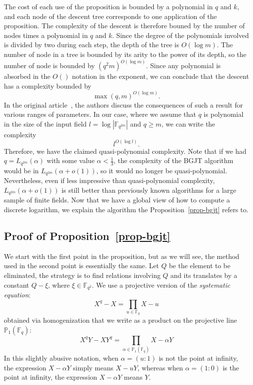 \documentclass[a4paper,11pt]{article}
\theoremstyle{break}
\theoremstyle{sc}
\theoremstyle{definition}
\theoremstyle{remark}
\begin{document}
The cost of each use of the proposition is bounded by a polynomial in $q$ and
$k$, and each node of the descent tree corresponds to one application of the
proposition. The complexity of the descent is therefore bouned by the number of
nodes times a polynomial in $q$ and $k$. Since the degree of the polynomials
involved is divided by two during each step, the depth of the tree is
$O(\log m)$. The number of node in a tree is bounded by its arity to the power
of its depth, so the number of node is bounded by $(q^2m)^{O(\log m)}$. Since
any polynomial is absorbed in the $O()$ notation in the exponent, we can
conclude that the descent has a complexity bounded by
\[
  \max(q, m)^{O(\log m)}.
\]
In the original article~\cite{BGJT13}, the authors discuss the consequences of
such a result for various ranges of parameters. In our case, where we assume
that $q$ is polynomial in the size of the input field $l=\log|\mathbb{F}_{q^{2m}}|$ and
$q\geq m$, we can write the complexity
\[
  l^{O(\log l)}.
\]
Therefore, we have the claimed quasi-polynomial complexity. Note that if we had
$q = L_{q^{2m}}(\alpha)$ with some value $\alpha<\frac{1}{3}$, the complexity of the BGJT
algorithm would be in
$L_{q^{2m}}(\alpha+o(1))$, so it would no longer be quasi-polynomial. Nevertheless, even if
less impressive than quasi-polynomial complexity, $L_{q^{2m}}(\alpha+o(1))$ is
still better than previously known algorithms for a large sample of finite
fields. Now that we have a global view of how to compute a discrete logarithm,
we explain the algorithm the Proposition~\ref{prop-bgjt} refers to.

\subsection{Proof of Proposition~\ref{prop-bgjt}}

We start with the first point in the proposition, but as we will see, the method
used in the second point is essentially the same. Let $Q$ be the element to
be eliminated, the strategy is to find relations involving $Q$ and its
translates by a constant $Q-\xi$, where $\xi\in\mathbb{F}_{q^2}$. We use a
projective version of the
\emph{systematic equation}:
\[
  X^q - X = \prod_{u\in\mathbb{F}_q} X-u 
\]
obtained via homogenization that we write as a product on the projective
line $\mathbb{P}_1(\mathbb{F}_q)$:
  \begin{equation} 
  X^qY-XY^q = \prod_{\alpha\in\mathbb{P}_1(\mathbb{F}_q)} X - \alpha Y
    \label{proj-eq}
  \end{equation}
In this slightly abusive notation, when $\alpha=(u:1)$ is not the point at
infinity, the expression $X-\alpha Y$ simply means $X-uY$, whereas when
$\alpha=(1:0)$ is the point at infinity, the expression $X-\alpha Y$ means $Y$.
\end{document}
